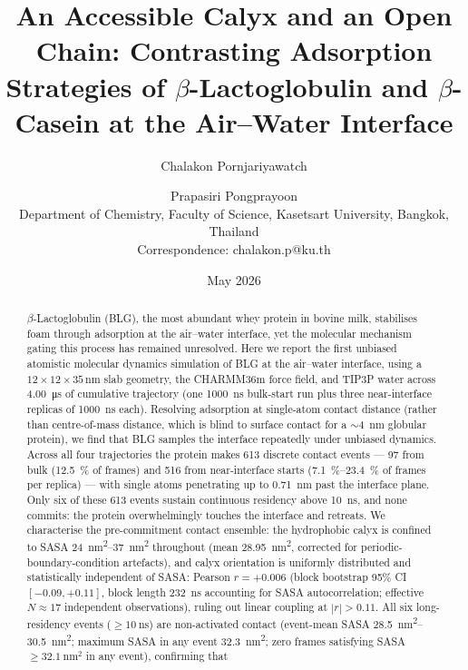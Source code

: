 \documentclass[11pt,a4paper]{article}
\title{\large An Accessible Calyx and an Open Chain: Contrasting
       Adsorption Strategies of \boldmath$\beta$-Lactoglobulin and
       $\beta$-Casein at the Air--Water Interface}
\author{Chalakon Pornjariyawatch \and Prapasiri Pongprayoon\\[2pt]
        \small Department of Chemistry, Faculty of Science,
        Kasetsart University, Bangkok, Thailand\\
        \small Correspondence: chalakon.p@ku.th}
\date{May 2026}
\begin{document}
\maketitle

\begin{abstract}
\noindent
$\beta$-Lactoglobulin (BLG), the most abundant whey protein in bovine milk,
stabilises foam through adsorption at the air--water interface, yet the
molecular mechanism gating this process has remained unresolved. Here we
report the first unbiased atomistic molecular dynamics simulation of BLG
at the air--water interface, using a $12\times12\times35$\,\si{\nano\metre} slab
geometry, the CHARMM36m force field, and TIP3P water across
\SI{4.00}{\micro\second} of cumulative trajectory (one \SI{1000}{\nano\second}
bulk-start run plus three near-interface replicas of
\SI{1000}{\nano\second} each). Resolving adsorption at
single-atom contact distance (rather than centre-of-mass distance, which
is blind to surface contact for a $\sim$\SI{4}{\nano\metre} globular
protein), we find that BLG samples the interface repeatedly under
unbiased dynamics. Across all four trajectories the protein makes
\num{613} discrete contact events --- \num{97} from bulk (\SI{12.5}{\percent}
of frames) and \num{516} from near-interface starts
(\SIrange{7.1}{23.4}{\percent} of frames per replica) --- with single
atoms penetrating up to \SI{0.71}{\nano\metre} past the interface plane.
Only six of these \num{613} events sustain continuous residency
above \SI{10}{\nano\second}, and none commits: the protein
overwhelmingly touches the interface and retreats.
We characterise the pre-commitment contact ensemble: the hydrophobic
calyx is confined to SASA \SIrange{24}{37}{\nano\metre\squared}
throughout (mean \SI{28.95}{\nano\metre\squared}, corrected for
periodic-boundary-condition artefacts), and calyx orientation is
uniformly distributed and statistically independent of SASA:
Pearson $r = +0.006$ (block bootstrap 95\% CI $[-0.09, +0.11]$, block
length \SI{232}{\nano\second} accounting for SASA autocorrelation;
effective $N \approx 17$ independent observations), ruling out linear
coupling at $|r| > 0.11$.
All six long-residency events ($\geq\!\SI{10}{\nano\second}$) are
non-activated contact (event-mean SASA \SIrange{28.5}{30.5}{\nano\metre\squared};
maximum SASA in any event \SI{32.3}{\nano\metre\squared}; zero frames
satisfying SASA $\geq \SI{32.1}{\nano\metre\squared}$ in any event), confirming that

\end{abstract}
\end{document}
